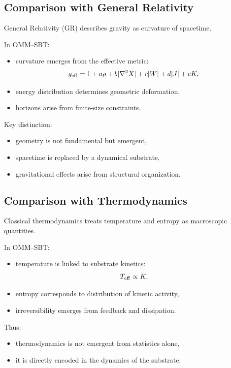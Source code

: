 \documentclass[11pt]{article}
\begin{document}
\subsection{Comparison with General Relativity}

General Relativity (GR) describes gravity as curvature of spacetime.

In OMM--SBT:
\begin{itemize}
\item curvature emerges from the effective metric:
\begin{equation}
g_{\rm eff} = 1 + a\rho + b|\nabla^2X| + c|W| + d|J| + eK,
\end{equation}
\item energy distribution determines geometric deformation,
\item horizons arise from finite-size constraints.
\end{itemize}

Key distinction:
\begin{itemize}
\item geometry is not fundamental but emergent,
\item spacetime is replaced by a dynamical substrate,
\item gravitational effects arise from structural organization.
\end{itemize}

\subsection{Comparison with Thermodynamics}

Classical thermodynamics treats temperature and entropy as macroscopic quantities.

In OMM--SBT:
\begin{itemize}
\item temperature is linked to substrate kinetics:
\begin{equation}
T_{\rm eff} \propto K,
\end{equation}
\item entropy corresponds to distribution of kinetic activity,
\item irreversibility emerges from feedback and dissipation.
\end{itemize}

Thus:
\begin{itemize}
\item thermodynamics is not emergent from statistics alone,
\item it is directly encoded in the dynamics of the substrate.
\end{itemize}
\end{document}
